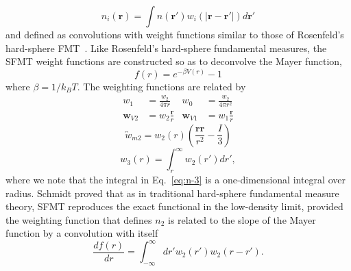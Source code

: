 \documentclass[letterpaper,twocolumn,amsmath,amssymb,prb]{revtex4-1}
\begin{document}
\begin{equation}
  n_{i}(\textbf{r}) = \int
  n(\textbf{r}')w_i(|\textbf{r}-\textbf{r}'|) d\textbf{r}'
  \label{eq:n-convolution}
\end{equation}
and defined as convolutions with weight 
functions similar to those of 
Rosenfeld's hard-sphere FMT~\cite{rosenfeld1989}. 
Like Rosenfeld's hard-sphere fundamental measures, the SFMT weight
functions are constructed so as to deconvolve the Mayer function,
\begin{equation}
  f(r) = e^{-\beta V(r)} - 1
  \label{eq:Mayerfunction}
\end{equation}
where $\beta = 1/k_BT$. %
The weighting functions are related by
\begin{align}
  w_1 &= \frac{w_2}{4\pi r} &
  w_0 &= \frac{w_2}{4\pi r^2}
  \label{eq:n-0-1}
  \\
  \mathbf{w}_{V2} &= w_2\frac{\textbf{r}}{r} &
  \mathbf{w}_{V1} &= w_1\frac{\textbf{r}}{r}
  \label{eq:n-vectors}
\end{align}
\begin{equation}
  \overleftrightarrow{w}_{m2} = w_2(r)\left(\frac{\mathbf{rr}}{r^2}-\frac{I}{3}\right)
  \label{eq:n-tensor}
\end{equation}
\begin{equation}
   w_3(r) = \int_{r}^{\infty} w_2(r') dr',
  \label{eq:n-3}
\end{equation}
where we note that the integral in Eq.~\ref{eq:n-3} is a
one-dimensional integral over radius. Schmidt proved that as in traditional 
hard-sphere fundamental measure theory, 
SFMT reproduces the exact functional in the low-density limit, provided the 
weighting function that defines $n_2$ is related to the slope of the Mayer 
function by a convolution with itself
\begin{equation}\label{eq:mayerandw2}
  \frac{d f(r)}{dr} = \int_{-\infty}^{\infty} dr' w_2(r') w_2 (r-r').
\end{equation}
\end{document}
